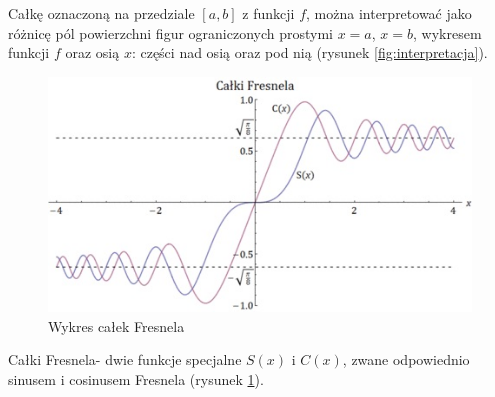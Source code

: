 \documentclass{article}
\begin{document}
Całkę oznaczoną na przedziale $[a, b]$ z funkcji $f$, można interpretować jako różnicę pól powierzchni figur ograniczonych prostymi $x = a$, $x = b$, wykresem funkcji $f$ oraz osią $x$: części nad osią oraz pod nią (rysunek \ref{fig:interpretacja}).

\begin{figure}
\caption{Wykres całek Fresnela}
\label{fig:fresnel}
\includegraphics[scale=0.6]{calka2.png}
\centering
\end{figure}

Całki Fresnela- dwie funkcje specjalne $S(x)$ i $C(x)$, zwane odpowiednio sinusem i cosinusem Fresnela (rysunek \ref{fig:fresnel}).
\end{document}
